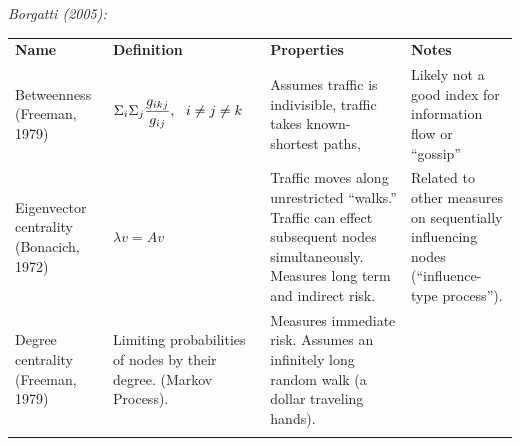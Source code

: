 \documentclass[12pt]{article}\usepackage[]{graphicx}\usepackage[]{color}
\begin{document}
\begin{flushleft}
\textit{Borgatti (2005):}
\begin{longtable}{m{2.8cm}  m{4cm} m{5.7cm} m{4.7cm}  }
\hline\noalign{\smallskip}
\textbf{Name} & \textbf{Definition} & \textbf{Properties} & \textbf{Notes} \\
\noalign{\smallskip}\hline\noalign{\smallskip}
Betweenness (Freeman, 1979) & $\mathlarger{ \Sigma_i \Sigma_j \frac{g_{ikj}}{g_{ij}}, ~~ i \neq j \neq k }$ & Assumes traffic is indivisible, traffic takes known-shortest paths,   & Likely not a good index for information flow or ``gossip'' \\
Eigenvector centrality (Bonacich, 1972) & $\lambda v = A v$ & Traffic moves along unrestricted ``walks.'' Traffic can effect subsequent nodes simultaneously. Measures long term and indirect risk.   & Related to other measures on sequentially influencing nodes (``influence-type process'').\\
Degree centrality (Freeman, 1979) & Limiting probabilities of nodes by their degree. (Markov Process).    & Measures immediate risk. Assumes an infinitely long random walk (a dollar traveling hands). \\
\noalign{\smallskip}\hline\noalign{\smallskip}
\end{longtable}



\end{flushleft}
\end{document}
